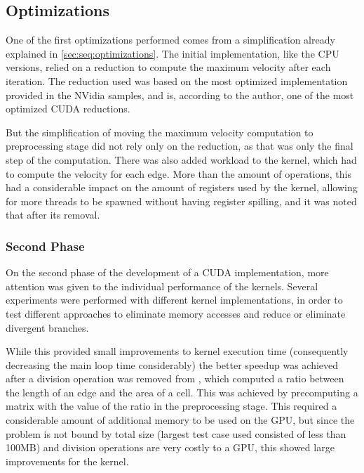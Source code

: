 \subsection{Optimizations}
\label{subsec:cuda:load}


One of the first optimizations performed comes from a simplification already explained in \cref{sec:seq:optimizations}.
The initial implementation, like the CPU versions, relied on a reduction to compute the maximum velocity after each iteration.
The reduction used was based on the most optimized implementation provided in the NVidia samples, and is, according to the author, one of the most optimized CUDA reductions.

But the simplification of moving the maximum velocity computation to preprocessing stage did not rely only on the reduction, as that was only the final step of the computation.
There was also added workload to the \computeflux kernel, which had to compute the velocity for each edge. More than the amount of operations, this had a considerable impact on the amount of registers used by the kernel, allowing for more threads to be spawned without having register spilling, and it was noted that after its removal.

\subsubsection{Second Phase}
\label{subsubsec:cuda:load:second}

On the second phase of the development of a CUDA implementation, more attention was given to the individual performance of the kernels.
Several experiments were performed with different kernel implementations, in order to test different approaches to eliminate memory accesses and reduce or eliminate divergent branches.

While this provided small improvements to kernel execution time (consequently decreasing the main loop time considerably) the better speedup was achieved after a division operation was removed from \update, which computed a ratio between the length of an edge and the area of a cell.
This was achieved by precomputing a matrix with the value of the ratio in the preprocessing stage.
This required a considerable amount of additional memory to be used on the GPU, but since the problem is not bound by total size (largest test case used consisted of less than 100MB) and division operations are very costly to a GPU, this showed large improvements for the \update kernel.

